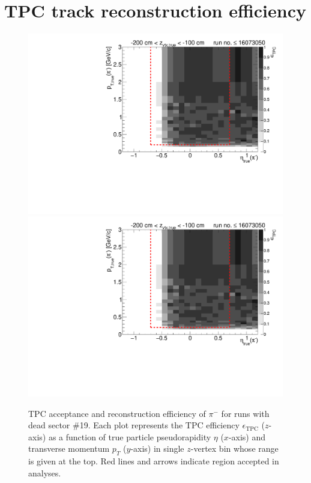 
\chapter{TPC track reconstruction efficiency}\label{appendix:tpcEff}


\begin{figure}[hb]
\caption[TPC acceptance and reconstruction efficiency of $\pi^{-}$ for runs with dead sector \#19.]{TPC acceptance and reconstruction efficiency of $\pi^{-}$ for runs with dead sector \#19. Each plot represents the TPC efficiency $\epsilon_{\text{TPC}}$ ($z$-axis) as a function of true particle pseudorapidity $\eta$ ($x$-axis) and transverse momentum $p_{T}$ ($y$-axis) in single $z$-vertex bin whose range is given at the top. Red lines and arrows indicate region accepted in analyses.}\label{fig:tpcEff_pion_minus}
\centering
\parbox{0.495\textwidth}{
  \centering
  \includegraphics[width=\linewidth,page=3]{graphics/eff/Eff2D_TPC_pion_Minus_RunRange1.pdf}\\
  \includegraphics[width=\linewidth,page=5]{graphics/eff/Eff2D_TPC_pion_Minus_RunRange1.pdf}\\
}
\end{figure}
